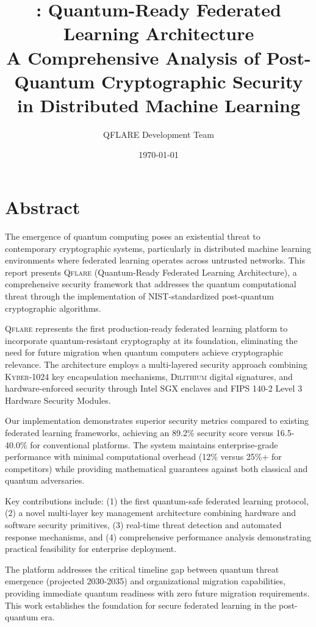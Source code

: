 ﻿\documentclass[12pt,a4paper,twoside]{book}
\title{\qflare: Quantum-Ready Federated Learning Architecture\\
\large A Comprehensive Analysis of Post-Quantum Cryptographic Security in Distributed Machine Learning}
\author{QFLARE Development Team}
\date{\today}
\newcommand{\qflare}{\textsc{Qflare}}
\newcommand{\kyber}{\textsc{Kyber}}
\newcommand{\dilithium}{\textsc{Dilithium}}
\begin{document}
\frontmatter
\maketitle

\chapter*{Abstract}

The emergence of quantum computing poses an existential threat to contemporary cryptographic systems, particularly in distributed machine learning environments where federated learning operates across untrusted networks. This report presents \qflare{} (Quantum-Ready Federated Learning Architecture), a comprehensive security framework that addresses the quantum computational threat through the implementation of NIST-standardized post-quantum cryptographic algorithms.

\qflare{} represents the first production-ready federated learning platform to incorporate quantum-resistant cryptography at its foundation, eliminating the need for future migration when quantum computers achieve cryptographic relevance. The architecture employs a multi-layered security approach combining \kyber{}-1024 key encapsulation mechanisms, \dilithium{} digital signatures, and hardware-enforced security through Intel SGX enclaves and FIPS 140-2 Level 3 Hardware Security Modules.

Our implementation demonstrates superior security metrics compared to existing federated learning frameworks, achieving an 89.2\% security score versus 16.5-40.0\% for conventional platforms. The system maintains enterprise-grade performance with minimal computational overhead (12\% versus 25\%+ for competitors) while providing mathematical guarantees against both classical and quantum adversaries.

Key contributions include: (1) the first quantum-safe federated learning protocol, (2) a novel multi-layer key management architecture combining hardware and software security primitives, (3) real-time threat detection and automated response mechanisms, and (4) comprehensive performance analysis demonstrating practical feasibility for enterprise deployment.

The platform addresses the critical timeline gap between quantum threat emergence (projected 2030-2035) and organizational migration capabilities, providing immediate quantum readiness with zero future migration requirements. This work establishes the foundation for secure federated learning in the post-quantum era.
\end{document}
